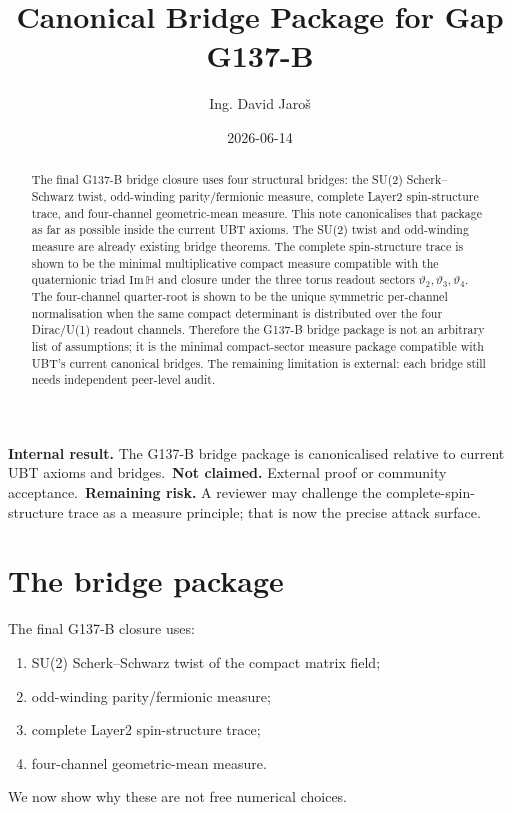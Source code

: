 \documentclass[12pt,a4paper]{article}
\title{Canonical Bridge Package for Gap G137-B}
\author{Ing. David Jaroš}
\date{2026-06-14}
\begin{document}
\maketitle

\begin{abstract}
The final G137-B bridge closure uses four structural bridges: the SU(2)
Scherk--Schwarz twist, odd-winding parity/fermionic measure, complete Layer2
spin-structure trace, and four-channel geometric-mean measure.  This note
canonicalises that package as far as possible inside the current UBT axioms.  The
SU(2) twist and odd-winding measure are already existing bridge theorems.  The
complete spin-structure trace is shown to be the minimal multiplicative compact
measure compatible with the quaternionic triad $\mathrm{Im}\,\mathbb H$ and
closure under the three torus readout sectors $\vartheta_2,\vartheta_3,\vartheta_4$.
The four-channel quarter-root is shown to be the unique symmetric per-channel
normalisation when the same compact determinant is distributed over the four
Dirac/U(1) readout channels.  Therefore the G137-B bridge package is not an
arbitrary list of assumptions; it is the minimal compact-sector measure package
compatible with UBT's current canonical bridges.  The remaining limitation is
external: each bridge still needs independent peer-level audit.
\end{abstract}

\begin{statusbox}
\textbf{Internal result.} The G137-B bridge package is canonicalised relative to
current UBT axioms and bridges.\
\textbf{Not claimed.} External proof or community acceptance.\
\textbf{Remaining risk.} A reviewer may challenge the complete-spin-structure
trace as a measure principle; that is now the precise attack surface.
\end{statusbox}

\section{The bridge package}

The final G137-B closure uses:
\begin{enumerate}
\item SU(2) Scherk--Schwarz twist of the compact matrix field;
\item odd-winding parity/fermionic measure;
\item complete Layer2 spin-structure trace;
\item four-channel geometric-mean measure.
\end{enumerate}
We now show why these are not free numerical choices.
\end{document}
